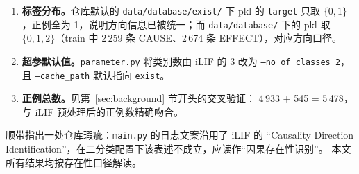 \begin{enumerate}
  \item \textbf{标签分布。}仓库默认的 \texttt{data/database/exist/} 下 pkl 的 \texttt{target}
        只取 $\{0,1\}$，正例全为 1，说明方向信息已被统一；而 \texttt{data/database/} 下的 pkl
        取 $\{0,1,2\}$（train 中 2\,259 条 CAUSE、2\,674 条 EFFECT），对应方向口径。
  \item \textbf{超参默认值。}\texttt{parameter.py} 将类别数由 iLIF 的 3 改为 \texttt{--no\_of\_classes 2}，
        且 \texttt{--cache\_path} 默认指向 \texttt{exist}。
  \item \textbf{正例总数。}见第~\ref{sec:background} 节开头的交叉验证：
        4\,933 + 545 = 5\,478，与 iLIF 预处理后的正例数精确吻合。
\end{enumerate}

顺带指出一处仓库瑕疵：\texttt{main.py} 的日志文案沿用了 iLIF 的
“Causality Direction Identification”，在二分类配置下该表述不成立，应读作“因果存在性识别”。
本文所有结果均按存在性口径解读。
